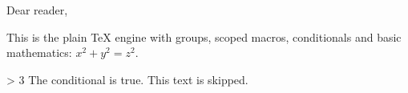 \def\name#1{Dear #1,}
\name{reader}

This is the plain TeX engine with groups, scoped macros,
conditionals and basic mathematics: $x^2 + y^2 = z^2$.

 > 3
The conditional is true.
\else
This text is skipped.
\fi
\bye
